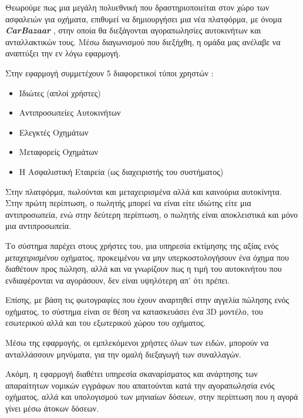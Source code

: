 \documentclass{../ol-softwaremanual}
\begin{document}
	
	\vspace{10pt}
	
	\flushleft
	
	Θεωρούμε πως μια μεγάλη πολυεθνική που δραστηριοποιείται στον χώρο των ασφαλειών για οχήματα, επιθυμεί να δημιουργήσει μια νέα πλατφόρμα, με όνομα  \en \textbf{\textit{CarBazaar}} \gr, στην οποία θα διεξάγονται αγοραπωλησίες αυτοκινήτων και ανταλλακτικών τους. Μέσω διαγωνισμού που διεξήχθη, η ομάδα μας ανέλαβε να αναπτύξει την εν λόγω εφαρμογή. \break
	
	Στην εφαρμογή συμμετέχουν 5 διαφορετικοί τύποι χρηστών :
	
	\begin{itemize}
		\item Ιδιώτες (απλοί χρήστες)
		\item Αντιπροσωπείες Αυτοκινήτων
		\item Ελεγκτές Οχημάτων
		\item Μεταφορείς Οχημάτων
		\item Η Ασφαλιστική Εταιρεία (ως διαχειριστής του συστήματος)
	\end{itemize}
	
	Στην πλατφόρμα, πωλούνται και μεταχειρισμένα αλλά και καινούρια αυτοκίνητα. Στην πρώτη περίπτωση, ο πωλητής μπορεί να είναι είτε ιδιώτης είτε μια αντιπροσωπεία, ενώ στην δεύτερη περίπτωση, ο πωλητής είναι αποκλειστικά και μόνο μια αντιπροσωπεία.  \break	
	
	Το σύστημα παρέχει στους χρήστες του, μια υπηρεσία εκτίμησης της αξίας ενός \textit{μεταχειρισμένου} οχήματος, προκειμένου να μην υπερκοστολογήσουν ένα όχημα που διαθέτουν προς πώληση, αλλά και να γνωρίζουν πως η τιμή του αυτοκινήτου που ενδιαφέρονται να αγοράσουν, δεν είναι υψηλότερη απ' ότι πρέπει. \break
	
	Επίσης, με βάση τις φωτογραφίες που έχουν αναρτηθεί στην αγγελία πώλησης ενός οχήματος, το σύστημα είναι σε θέση να κατασκευάσει ένα 3\en D \gr μοντέλο, του εσωτερικού αλλά και του εξωτερικού χώρου του οχήματος. \break
	
	Μέσω της εφαρμογής, οι εμπλεκόμενοι χρήστες όλων των ειδών, μπορούν να ανταλλάσσουν μηνύματα, για την ομαλή διεξαγωγή των συναλλαγών. \break
		
	Ακόμη, η εφαρμογή διαθέτει υπηρεσία σκαναρίσματος και ανάρτησης των απαραίτητων νομικών εγγράφων που απαιτούνται κατά την αγοραπωλησία ενός οχήματος, αλλά και υπολογισμού των μηνιαίων δόσεων, στην περίπτωση που η αγορά γίνει μέσω άτοκων δόσεων. \break
	
\end{document}
